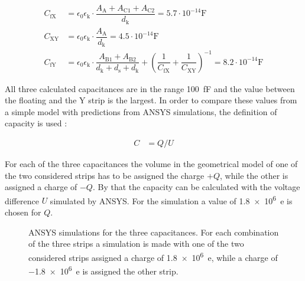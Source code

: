 \documentclass[
a4paper,                                %
twoside,                                %
BCOR1.4cm,                      %
10pt,                           %
headings=normal,                %
headsepline,                    %
clearplainpage, %
final,                                  %
div=14,
parskip=full,
openright,
bibliography=toc
]{scrreprt}
\begin{document}
\begin{align*}
	C_{\mathrm{fX}} &= \epsilon_{0}\epsilon_{\mathrm{k}} \cdot \dfrac{A_{\mathrm{A}} + A_{\mathrm{C1}} + A_{\mathrm{C2}}}{d_{\mathrm{k}}} = 5.7 \cdot 10^{-14} \mathrm{F}
	\\
	C_{\mathrm{XY}} &= \epsilon_{0}\epsilon_{\mathrm{k}} \cdot \dfrac{A_{\mathrm{A}}}{d_{\mathrm{k}}} = 4.5 \cdot 10^{-14} \mathrm{F}
	\\
	C_{\mathrm{fY}} &= \epsilon_{0}\epsilon_{\mathrm{k}} \cdot \dfrac{A_{\mathrm{B1}} + A_{\mathrm{B2}}}{d_{\mathrm{k}} + d_{\mathrm{s}} + d_{\mathrm{k}}} + \left(\dfrac{1}{C_{\mathrm{fX}}} + \dfrac{1}{C_{\mathrm{XY}}}\right)^{-1} = 8.2 \cdot 10^{-14} \mathrm{F}
\end{align*}

All three calculated capacitances are in the range \SI{100}{\femto\F} and the value between the floating and the Y strip is the largest. In order to compare these values from a simple model with predictions from ANSYS simulations, the definition of capacity is used : 

\begin{align}\label{capaDef}
	C &= Q / U
\end{align}

For each of the three capacitances the volume in the geometrical model of one of the two considered strips has to be assigned the charge $+Q$, while the other is assigned a charge of $-Q$. By that the capacity can be calculated with the voltage difference $U$ simulated by ANSYS. For the simulation a value of \SI{1.8e6}{e} is chosen for $Q$.

\begin{figure}[H]	
	\centering
	\qquad
	\qquad
	\caption{ANSYS simulations for the three capacitances. For each combination of the three strips a simulation is made with one of the two considered strips assigned a charge of \SI{+1.8e6}{e}, while a charge of \SI{-1.8e6}{e} is assigned the other strip.}
	\label{unitcellCapaloads}
\end{figure}
\end{document}

